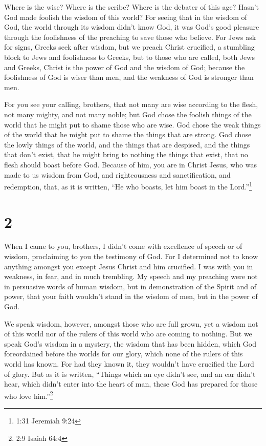  Where is the wise? Where is the scribe? Where is the
debater of this age? Hasn't God made foolish the wisdom of this world?
 For seeing that in the wisdom of God, the world through
its wisdom didn't know God, it was God's good pleasure through the
foolishness of the preaching to save those who believe. 
For Jews ask for signs, Greeks seek after wisdom,  but we
preach Christ crucified, a stumbling block to Jews and foolishness to
Greeks,  but to those who are called, both Jews and Greeks,
Christ is the power of God and the wisdom of God;  because
the foolishness of God is wiser than men, and the weakness of God is
stronger than men.

 For you see your calling, brothers, that not many are wise
according to the flesh, not many mighty, and not many noble;
 but God chose the foolish things of the world that he
might put to shame those who are wise. God chose the weak things of the
world that he might put to shame the things that are strong.
 God chose the lowly things of the world, and the things
that are despised, and the things that don't exist, that he might bring
to nothing the things that exist,  that no flesh should
boast before God.  Because of him, you are in Christ Jesus,
who was made to us wisdom from God, and righteousness and
sanctification, and redemption,  that, as it is written,
``He who boasts, let him boast in the Lord.''\footnote{1:31 Jeremiah
  9:24}

\hypertarget{section-1}{%
\section{2}\label{section-1}}

 When I came to you, brothers, I didn't come with excellence
of speech or of wisdom, proclaiming to you the testimony of God.
 For I determined not to know anything amongst you except
Jesus Christ and him crucified.  I was with you in weakness,
in fear, and in much trembling.  My speech and my preaching
were not in persuasive words of human wisdom, but in demonstration of
the Spirit and of power,  that your faith wouldn't stand in
the wisdom of men, but in the power of God.

 We speak wisdom, however, amongst those who are full grown,
yet a wisdom not of this world nor of the rulers of this world who are
coming to nothing.  But we speak God's wisdom in a mystery,
the wisdom that has been hidden, which God foreordained before the
worlds for our glory,  which none of the rulers of this
world has known. For had they known it, they wouldn't have crucified the
Lord of glory.  But as it is written, ``Things which an eye
didn't see, and an ear didn't hear, which didn't enter into the heart of
man, these God has prepared for those who love him.''\footnote{2:9
  Isaiah 64:4}

